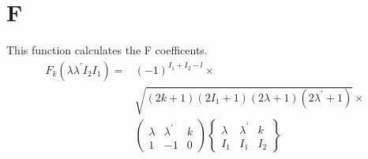 \section{F}
\label{sect:f}

\noindent This function calculates the F coefficents.\\

\begin{eqnarray}
F_k(\lambda \lambda^\prime I_2 I_1) =& (-1)^{I_1 + I_2 - l} \times \nonumber\\
&\sqrt{(2 k + 1) (2 I_1 + 1) (2 \lambda + 1) (2 \lambda^\prime + 1)} \times \nonumber\\
%
&\begin{pmatrix}
\lambda & \lambda^\prime & k\\
1 & -1 & 0
\end{pmatrix}
%
\begin{Bmatrix}
\lambda & \lambda^\prime & k\\
I_1 & I_1 & I_2
\end{Bmatrix}
\end{eqnarray}

